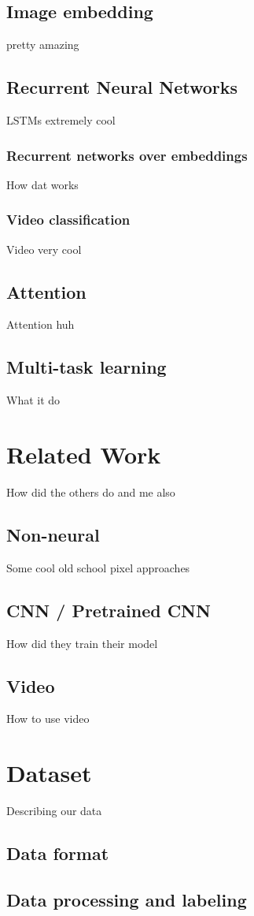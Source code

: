 \section{Image embedding}
pretty amazing
\section{Recurrent Neural Networks}
LSTMs extremely cool
\subsection{Recurrent networks over embeddings}
How dat works
\subsection{Video classification}
Video very cool
\section{Attention}
Attention huh
\section{Multi-task learning}
What it do
\chapter{Related Work}
How did the others do and me also
\section{Non-neural}
Some cool old school pixel approaches
\section{CNN / Pretrained CNN}
How did they train their model
\section{Video}
How to use video\cite{guerra_weather_2018}
\chapter{Dataset}
Describing our data
\section{Data format}
\section{Data processing and labeling}
